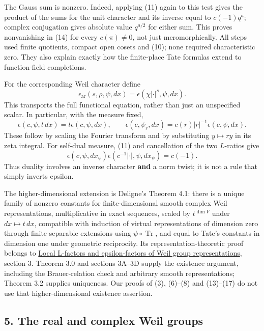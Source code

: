 \documentclass[11pt,a4paper]{article}
\begin{document}
The Gauss sum is nonzero. Indeed, applying (11) again to this test gives
the product of the sums for the unit character and its inverse equal to
\(c(-1)q^a\); complex conjugation gives absolute value \(q^{a/2}\) for
either sum. This proves nonvanishing in (14) for every \(c(\pi)\ne0\),
not just meromorphically. All steps used finite quotients, compact open
cosets and (10); none required characteristic zero. They also explain
exactly how the finite-place Tate formulas extend to function-field
completions.

For the corresponding Weil character define \[
\epsilon_{\mathrm{ar}}(s,\rho,\psi,dx)
=\epsilon(\chi|\cdot|^s,\psi,dx).
\tag{15}
\] This transports the full functional equation, rather than just an
unspecified scalar. In particular, with the measure fixed, \[
\epsilon(c,\psi,t\,dx)=t\epsilon(c,\psi,dx),\qquad
\epsilon(c,\psi_r,dx)=c(r)|r|^{-1}\epsilon(c,\psi,dx).
\tag{16}
\] These follow by scaling the Fourier transform and by substituting
\(y\mapsto ry\) in its zeta integral. For self-dual measure, (11) and
cancellation of the two \(L\)-ratios give \[
\epsilon(c,\psi,dx_\psi)\epsilon(c^{-1}|\cdot|,\psi,dx_\psi)=c(-1).
\tag{17}
\] Thus duality involves an inverse character \textbf{and} a norm twist;
it is not a rule that simply inverts epsilon.

The higher-dimensional extension is Deligne's Theorem 4.1: there is a
unique family of nonzero constants for finite-dimensional smooth complex
Weil representations, multiplicative in exact sequences, scaled by
\(t^{\dim V}\) under \(dx\mapsto t\,dx\), compatible with induction of
virtual representations of dimension zero through finite separable
extensions using \(\psi\circ\operatorname{Tr}\), and equal to Tate's
constants in dimension one under geometric reciprocity. Its
representation-theoretic proof belongs to
\href{https://kokunoyumeto.github.io/open-math-courses/courses/LG-GAL/local-l-factors-and-epsilon-factors.html\#3-existence-and-uniqueness-of-local-constants}{Local
L-factors and epsilon-factors of Weil group representations}, section 3.
Theorem 3.0 and sections 3A–3D supply the existence argument, including the Brauer-relation check and arbitrary smooth representations; Theorem 3.2 supplies uniqueness. Our proofs of (3), (6)--(8) and
(13)--(17) do not use that higher-dimensional existence assertion.

\subsection{5. The real and complex Weil
groups}\label{the-real-and-complex-weil-groups}
\end{document}
